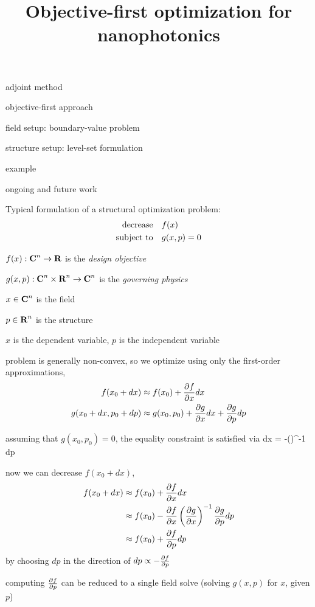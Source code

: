 \documentclass[dvips,landscape]{foils}
\title{Objective-first optimization for nanophotonics}
\author{}
\date{}
\renewcommand{\oursection}[1]{
\foilhead[-1.0cm]{#1}
}
\begin{document}
\setlength{\parskip}{0cm}
\maketitle

\BIT \itemsep -1pt
\item adjoint method
\item objective-first approach
\item field setup: boundary-value problem
\item structure setup: level-set formulation
\item example
\item ongoing and future work
\EIT

\vfill

\oursection{Adjoint method}
Typical formulation of a structural optimization problem:
\begin{align}
\mbox{decrease} & \quad f(x) \\
\mbox{subject to} & \quad g(x,p) = 0
\end{align}
\BIT
\item $f(x): {\mbox{\bf C}}^n \to {\mbox{\bf R}}$ is the \emph{design objective}
\item $g(x,p): {\mbox{\bf C}}^n \times {\mbox{\bf R}}^n \to {\mbox{\bf C}}^n$ is the \emph{governing physics}
\item $x \in {\mbox{\bf C}}^n$ is the field 
\item $p \in {\mbox{\bf R}}^n$ is the structure 
\item $x$ is the dependent variable, $p$ is the independent variable
\EIT
\newpage

\BIT
\item problem is generally non-convex, so we optimize using only the first-order approximations,
\begin{align}
f(x_0+dx) & \approx f(x_0) + \frac{\partial f}{\partial x} dx \\
g(x_0+dx,p_0+dp) & \approx g(x_0,p_0) + \frac{\partial g}{\partial x} dx + \frac{\partial g}{\partial p} dp
\end{align}
\item assuming that $g(x_0,p_0) = 0$, the equality constraint is satisfied via
    \BEQ  dx = -\left(\right)^{-1}  dp \EEQ
\EIT
\newpage

\BIT
\item now we can decrease $f(x_0+dx)$,
    \begin{align} 
    f(x_0+dx) & \approx f(x_0) + \frac{\partial f}{\partial x} dx \\
        & \approx f(x_0) - \frac{\partial f}{\partial x} \left(\frac{\partial g}{\partial x}\right)^{-1} \frac{\partial g}{\partial p} dp \\
        & \approx f(x_0) + \frac{\partial f}{\partial p} dp
    \end{align}
    by choosing $dp$ in the direction of $dp \propto -\frac{\partial f}{\partial p}$
\item computing $\frac{\partial f}{\partial p}$ can be reduced to a single field solve (\ie solving $g(x,p)$ for $x$, given $p$)
\EIT
\newpage
\end{document}
